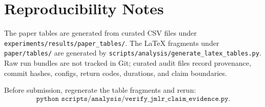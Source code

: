 \section{Reproducibility Notes}

The paper tables are generated from curated CSV files under
\texttt{experiments/results/paper\_tables/}.  The LaTeX fragments under
\texttt{paper/tables/} are generated by
\texttt{scripts/analysis/generate\_latex\_tables.py}.  Raw run bundles are not
tracked in Git; curated audit files record provenance, commit hashes, configs,
return codes, durations, and claim boundaries.

Before submission, regenerate the table fragments and rerun:
\[
\texttt{python scripts/analysis/verify\_jmlr\_claim\_evidence.py}.
\]
